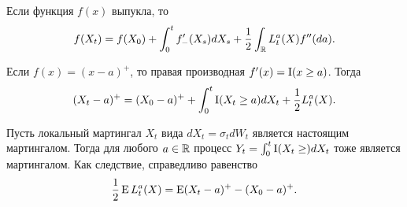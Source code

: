 \begin{proposition}
Если функция $f(x)$ выпукла, то 
\[
f(X_t) = f(X_0) + \int_0^t f'_-(X_s) dX_s + \frac12 \int_{\mathbb{R}} L_t^a(X) f''(da).
\]
\end{proposition}

\begin{example}
Если $f(x) = (x-a)^+$, то правая производная $f'(x) = \operatorname{I}(x\ge a)$. Тогда
\[
(X_t-a)^+ = (X_0-a)^+ + \int_0^t \operatorname{I}(X_t\ge a) dX_t + \frac12 L_t^a(X).
\]
\end{example}

\begin{proposition}
\label{lv:l:martingale}
Пусть локальный мартингал $X_t$ вида $dX_t = \sigma_t dW_t$ является настоящим мартингалом.
Тогда для любого $a\in\mathbb{R}$ процесс $Y_t = \int_0^t \operatorname{I}(X_t\ge) d X_t$ тоже является мартингалом. 
Как следствие, справедливо равенство
\[
\frac12\operatorname{E} L_t^a(X) = \operatorname{E}(X_t-a)^+ - (X_0-a)^+.
\] 
\end{proposition}



